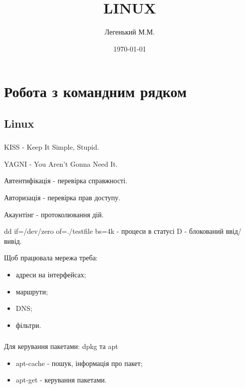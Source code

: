 \documentclass[t]{beamer}  %
\title{LINUX}
\author{Легенький М.М.}
\date{\today}
\institute[факультет радіофізики, біомедичної електроніки та комп'ютерних систем]{Харківський національний університет імені В. Н. Каразіна}
\begin{document}
\frame[plain]{\titlepage}	%

\section{Робота з командним рядком}
\subsection{Linux}
 
\begin{frame}
	\frametitle{\insertsection} 
	\framesubtitle{\insertsubsection}
KISS - Keep It Simple, Stupid.

YAGNI - You Aren't Gonna Need It.

Автентифікація - перевірка справжності.

Авторизація - перевірка прав доступу.

Акаунтінг - протоколювання дій.

dd if=/dev/zero of=./testfile bs=4k - процеси в статусі D - блокований ввід/вивід. 

Щоб працювала мережа треба:
\begin{itemize}
  \item адреси на інтерфейсах;
  \item маршрути;
  \item DNS;
  \item фільтри.
\end{itemize}
\end{frame}

\begin{frame}
	\frametitle{\insertsection} 
	\framesubtitle{\insertsubsection}
Для керування пакетами: dpkg та apt
\begin{itemize}
  \item apt-cache - пошук, інформація про пакет;
  \item apt-get - керування пакетами.
\end{itemize}
\end{frame}
\end{document}
